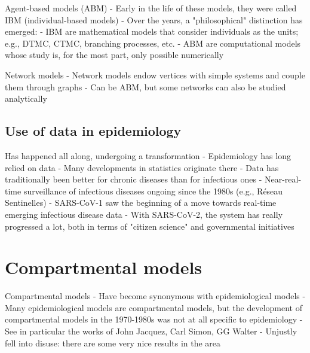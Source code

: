 \documentclass[aspectratio=43]{beamer}
\begin{document}
\begin{frame}{Agent-based models (ABM)}
- Early in the life of these models, they were called IBM (individual-based models)
\vfill
- Over the years, a "philosophical" distinction has emerged:
    - IBM are mathematical models that consider individuals as the units; e.g., DTMC, CTMC, branching processes, etc.
    - ABM are computational models whose study is, for the most part, only possible numerically 
\end{frame}

\begin{frame}{Network models}
- Network models endow vertices with simple systems and couple them through graphs
\vfill
- Can be ABM, but some networks can also be studied analytically

\end{frame}

\subsection{Use of data in epidemiology}

\begin{frame}{Has happened all along, undergoing a transformation}
- Epidemiology has long relied on data
\vfill
- Many developments in statistics originate there
\vfill
- Data has traditionally been better for chronic diseases than for infectious ones
\vfill
- Near-real-time surveillance of infectious diseases ongoing since the 1980s (e.g., Réseau Sentinelles)
\vfill
- SARS-CoV-1 saw the beginning of a move towards real-time emerging infectious disease data
\vfill
- With SARS-CoV-2, the system has really progressed a lot, both in terms of "citizen science" and governmental initiatives
\end{frame}



\section{Compartmental models}

\begin{frame}{Compartmental models}
- Have become synonymous with epidemiological models
\vfill
- Many epidemiological models are compartmental models, but the development of compartmental models in the 1970-1980s was not at all specific to epidemiology
\vfill
- See in particular the works of John Jacquez, Carl Simon, GG Walter
\vfill
- Unjustly fell into disuse: there are some very nice results in the area    
\end{frame}
\end{document}
